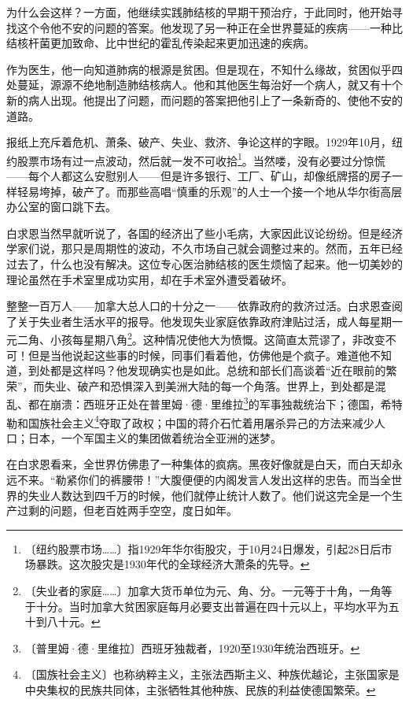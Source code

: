 \documentclass[12pt,UTF-8,openany]{ctexbook}
\begin{document}
\begin{large}
    为什么会这样？一方面，他继续实践肺结核的早期干预治疗，于此同时，他开始寻找这个令他不安的问题的答案。他发现了另一种正在全世界蔓延的疾病——一种比结核杆菌更加致命、比中世纪的霍乱传染起来更加迅速的疾病。
    
    作为医生，他一向知道肺病的根源是贫困。但是现在，不知什么缘故，贫困似乎四处蔓延，源源不绝地制造肺结核病人。他和其他医生每治好一个病人，就又有十个新的病人出现。他提出了问题，而问题的答案把他引上了一条新奇的、使他不安的道路。
    
    报纸上充斥着危机、萧条、破产、失业、救济、争论这样的字眼。1929年10月，纽约股票市场有过一点波动，然后就一发不可收拾\footnote{〔纽约股票市场……〕指1929年华尔街股灾，于10月24日爆发，引起28日后市场暴跌。这次股灾是1930年代的全球经济大萧条的先导。}。当然喽，没有必要过分惊慌——每个人都这么安慰别人——但是许多银行、工厂、矿山，却像纸牌搭的房子一样轻易垮掉，破产了。而那些高唱“慎重的乐观”的人士一个接一个地从华尔街高层办公室的窗口跳下去。
    
    白求恩当然早就听说了，各国的经济出了些小毛病，大家因此议论纷纷。但是经济学家们说，那只是周期性的波动，不久市场自己就会调整过来的。然而，五年已经过去了，什么也没有解决。这位专心医治肺结核的医生烦恼了起来。他一切美妙的理论虽然在手术室里成功实用，却在手术室外遭受着破坏。
    
    整整一百万人——加拿大总人口的十分之一——依靠政府的救济过活。白求恩查阅了关于失业者生活水平的报导。他发现失业家庭依靠政府津贴过活，成人每星期一元二角、小孩每星期八角\footnote{〔失业者的家庭……〕加拿大货币单位为元、角、分。一元等于十角，一角等于十分。当时加拿大贫困家庭每月必要支出普遍在四十元以上，平均水平为五十到八十元。}。这种情况使他大为愤慨。这简直太荒谬了，非改变不可！但是当他说起这些事的时候，同事们看着他，仿佛他是个疯子。难道他不知道，到处都是这样吗？他发现确实也是如此。总统和部长们高谈着“近在眼前的繁荣”，而失业、破产和恐惧深入到美洲大陆的每一个角落。世界上，到处都是混乱、都在崩溃：西班牙正处在普里姆·德·里维拉\footnote{〔普里姆·德·里维拉〕西班牙独裁者，1920至1930年统治西班牙。}的军事独裁统治下；德国，希特勒和国族社会主义\footnote{〔国族社会主义〕也称纳粹主义，主张法西斯主义、种族优越论，主张国家是中央集权的民族共同体，主张牺牲其他种族、民族的利益使德国繁荣。}夺取了政权；中国的蒋介石忙着用屠杀异己的方法来减少人口；日本，一个军国主义的集团做着统治全亚洲的迷梦。
    
    在白求恩看来，全世界仿佛患了一种集体的疯病。黑夜好像就是白天，而白天却永远不来。“勒紧你们的裤腰带！”大腹便便的内阁发言人发出这样的忠告。而当全世界的失业人数达到四千万的时候，他们就停止统计人数了。他们说这完全是一个生产过剩的问题，但老百姓两手空空，度日如年。
    

\end{large}
\end{document}
